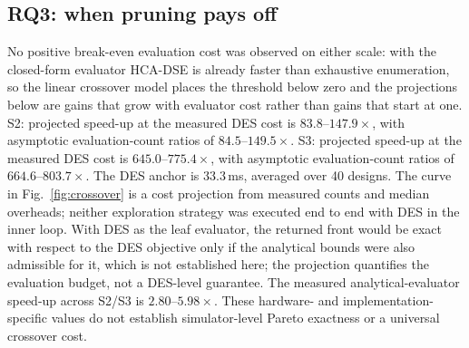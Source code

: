 \documentclass[preprint,11pt,3p]{elsarticle}
\theoremstyle{plain}
\theoremstyle{definition}
\newcommand{\DesCostMs}{33.3}
\begin{document}
\subsection{RQ3: when pruning pays off}
\providecommand{\RefFunnelSite}{Table~\ref{tab:funnel} and Fig.~\ref{fig:funnel}}
\providecommand{\RefFunnelTab}{Table~\ref{tab:funnel}}
\providecommand{\RefBaselinesTab}{Table~\ref{tab:baselines}}
\providecommand{\RefStatsTab}{Table~\ref{tab:stats}}
\providecommand{\RefHvFig}{Figure~\ref{fig:hv_budget}}
\providecommand{\RefCrossoverFig}{Fig.~\ref{fig:crossover}}
\providecommand{\RefAblationSite}{Table~\ref{tab:ablation} and Fig.~\ref{fig:ablation}}
\providecommand{\RefScalSite}{Table~\ref{tab:scalability} and Fig.~\ref{fig:scalability}}
\providecommand{\RefOrderTab}{Table~\ref{tab:order}}
\providecommand{\RefSolverTab}{Table~\ref{tab:solver}}
\providecommand{\RefDesTab}{Table~\ref{tab:des}}
\providecommand{\RefTestbedTab}{Table~\ref{tab:testbed}}
\providecommand{\RefReliabilityFig}{Fig.~\ref{fig:model_vs_measured}b}%
No positive break-even evaluation cost was observed on either scale: with the closed-form evaluator HCA-DSE is already faster than exhaustive enumeration, so the linear crossover model places the threshold below zero and the projections below are gains that grow with evaluator cost rather than gains that start at one.
S2: projected speed-up at the measured DES cost is $83.8\text{--}147.9\times$, with asymptotic evaluation-count ratios of $84.5\text{--}149.5\times$.
S3: projected speed-up at the measured DES cost is $645.0\text{--}775.4\times$, with asymptotic evaluation-count ratios of $664.6\text{--}803.7\times$. The DES anchor is $\DesCostMs$\,ms, averaged over 40 designs. The curve in
\RefCrossoverFig{} is a cost projection from measured counts and median overheads;
neither exploration strategy was executed end to end with DES in the inner loop. With DES as the leaf evaluator, the returned front would be exact with respect to the DES objective only if the analytical bounds were also admissible for it, which is not established here; the projection quantifies the evaluation budget, not a DES-level guarantee.
The measured analytical-evaluator speed-up across S2/S3 is $2.80\text{--}5.98\times$. These hardware- and implementation-specific values do not establish
simulator-level Pareto exactness or a universal crossover cost.
\end{document}
